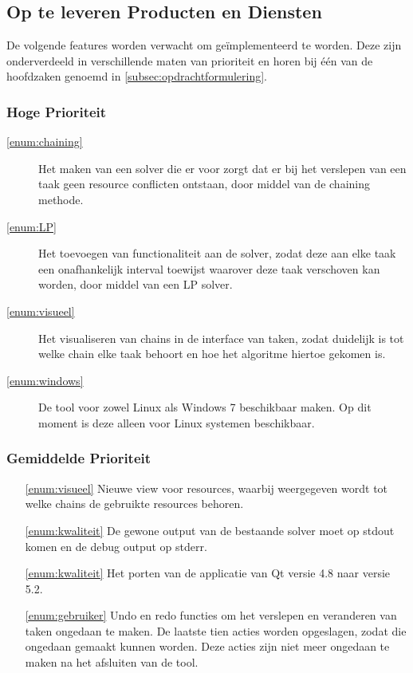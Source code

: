 \subsection{Op te leveren Producten en Diensten}
\label{subsec:producten}
De volgende features worden verwacht om ge\"implementeerd te worden. Deze zijn onderverdeeld in verschillende maten van prioriteit en horen bij \'e\'en van de hoofdzaken genoemd in \ref{subsec:opdrachtformulering}.

\subsubsection*{Hoge Prioriteit}
\begin{description}
	\item[\ref{enum:chaining}] Het maken van een solver die er voor zorgt dat er bij het verslepen van een taak geen resource conflicten ontstaan, door middel van de chaining methode.
	\item[\ref{enum:LP}] Het toevoegen van functionaliteit aan de solver, zodat deze aan elke taak een onafhankelijk interval toewijst waarover deze taak verschoven kan worden, door middel van een LP solver.
	\item[\ref{enum:visueel}] Het visualiseren van chains in de interface van taken, zodat duidelijk is tot welke chain elke taak behoort en hoe het algoritme hiertoe gekomen is.
	\item[\ref{enum:windows}] De tool voor zowel Linux als Windows 7 beschikbaar maken. Op dit moment is deze alleen voor Linux systemen beschikbaar.
\end{description}

\subsubsection*{Gemiddelde Prioriteit}
\begin{itemize}
	\item[\ref{enum:visueel}] Nieuwe view voor resources, waarbij weergegeven wordt tot welke chains de gebruikte resources behoren.
	\item[\ref{enum:kwaliteit}] De gewone output van de bestaande solver moet op stdout komen en de debug output op stderr.
	\item[\ref{enum:kwaliteit}] Het porten van de applicatie van Qt versie 4.8 naar versie 5.2.
	\item[\ref{enum:gebruiker}] Undo en redo functies om het verslepen en veranderen van taken ongedaan te maken. De laatste tien acties worden opgeslagen, zodat die ongedaan gemaakt kunnen worden. Deze acties zijn niet meer ongedaan te maken na het afsluiten van de tool.
\end{itemize}

